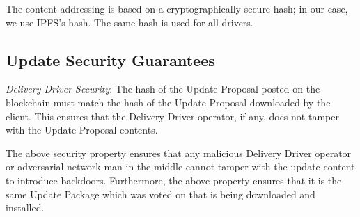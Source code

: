 The content-addressing is based on a cryptographically secure hash; in our case, we use IPFS's hash. The same hash is used for all drivers.

\subsection*{Update Security Guarantees}

\emph{Delivery Driver Security}: The hash of the Update Proposal posted on the blockchain must match the hash of the Update Proposal downloaded by the client. This ensures that the Delivery Driver operator, if any, does not tamper with the Update Proposal contents.

The above security property ensures that any malicious Delivery Driver operator or adversarial network man-in-the-middle cannot tamper with the update content to introduce backdoors. Furthermore, the above property ensures that it is the same Update Package which was voted on that is being downloaded and installed.

